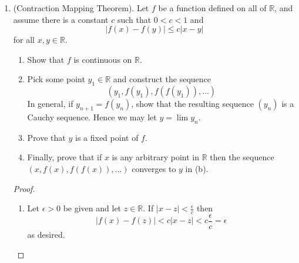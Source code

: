 \begin{enumerate}
    \item (Contraction Mapping Theorem). Let \( f \) be a function defined on all of \( \mathbb{R} \), and assume there is a constant \( c \) such that \( 0 < c < 1 \) and
    \[
    \vert f(x) - f(y) \vert \leq c \vert x - y \vert
    \]
    for all \( x,y \in \mathbb{R} \).
    \begin{enumerate}
        \item Show that \( f \) is continuous on \( \mathbb{R} \).
        
        \item Pick some point \( y_{1} \in \mathbb{R} \) and construct the sequence
        \[
        (y_{1}, f(y_{1}),f(f(y_{1})),\ldots)
        \]
        In general, if \( y_{n+1} = f(y_{n}) \), show that the resulting sequence \( (y_{n}) \) is a Cauchy sequence. Hence we may let \( y = \lim y_{n} \). 
        
        \item Prove that \( y \) is a fixed point of \( f \).
        
        \item Finally, prove that if \( x \) is any arbitrary point in \( \mathbb{R} \) then the sequence \( (x,f(x),f(f(x)),\ldots) \) converges to \( y \) in (b).
        \end{enumerate}
        
        \begin{proof}
        \begin{enumerate}
            \item Let \( \epsilon > 0 \) be given and let \( z \in \mathbb{R} \). If \( \vert x - z \vert < \frac{\epsilon}{c} \) then
            \[
            \vert f(x) - f(z) \vert < c\vert x-z \vert < c \frac{\epsilon}{c} = \epsilon
            \]
            as desired. 
            

\end{enumerate}
\end{proof}
\end{enumerate}

